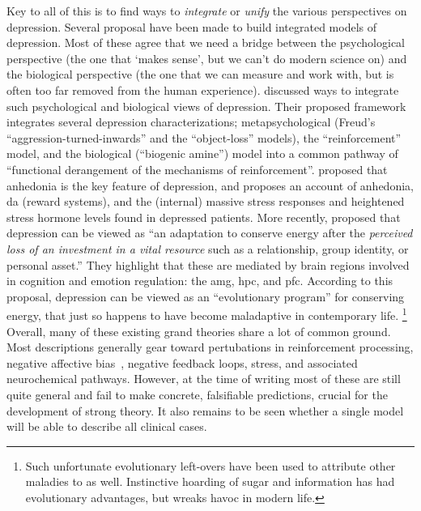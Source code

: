Key to all of this is to find ways to \emph{integrate} or \emph{unify} the various perspectives on depression.
Several proposal have been made to build integrated models of depression.
Most of these agree that we need a bridge between the psychological perspective (the one that `makes sense', but we can't do modern science on) and the biological perspective (the one that we can measure and work with, but is often too far removed from the human experience).
\textcite{Akiskal1973} discussed ways to integrate such psychological and biological views of depression.
Their proposed framework integrates several depression characterizations; metapsychological (Freud's ``aggression-turned-inwards'' and the ``object-loss'' models), the ``reinforcement'' model, and the biological (``biogenic amine'') model into a common pathway of ``functional derangement of the mechanisms of reinforcement''.
\textcite{Pizzagalli2014} proposed that anhedonia is the key feature of depression, and proposes an account of anhedonia, \gls{da} (reward systems), and the (internal) massive stress responses and heightened stress hormone levels found in depressed patients.
More recently, \textcite{Beck2016} proposed that depression can be viewed as ``an adaptation to conserve energy after the \emph{perceived loss of an investment in a vital resource} such as a relationship, group identity, or personal asset.''
They highlight that these are mediated by brain regions involved in cognition and emotion regulation: the \gls{amg}, \gls{hpc}, and \gls{pfc}.
According to this proposal, depression can be viewed as an ``evolutionary program'' for conserving energy, that just so happens to have become maladaptive in contemporary life.
\footnote{Such unfortunate evolutionary left-overs have been used to attribute other maladies to as well. Instinctive hoarding of sugar and information has had evolutionary advantages, but wreaks havoc in modern life.}
Overall, many of these existing grand theories share a lot of common ground.
Most descriptions generally gear toward pertubations in reinforcement processing, negative affective bias~\parencite{Pulcu2017}, negative feedback loops, stress, and associated neurochemical pathways.
However, at the time of writing most of these are still quite general and fail to make concrete, falsifiable predictions, crucial for the development of strong theory.
It also remains to be seen whether a single model will be able to describe all clinical cases.


